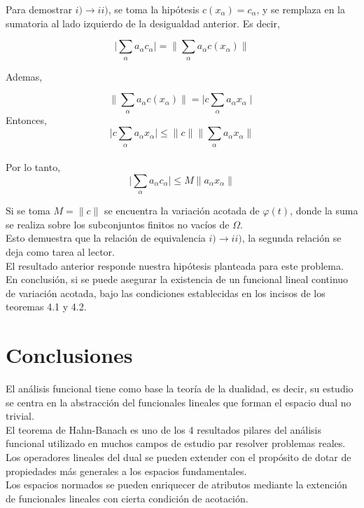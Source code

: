 \documentclass[10pt]{amsart}
\theoremstyle{remark}
\numberwithin{equation}{section}
\begin{document}
Para demostrar $i) \to ii)$, se toma la hipótesis $c(x_\alpha) = c_\alpha$, y se remplaza en la sumatoria al lado izquierdo de la desigualdad anterior. Es decir,

\[\mid \sum_\alpha a_\alpha c_\alpha \mid = \lVert \sum_\alpha a_\alpha c(x_\alpha) \rVert \]

Ademas,

\[\lVert \sum_\alpha a_\alpha c(x_\alpha) \rVert = \mid c \sum_\alpha a_\alpha x_\alpha \mid \]
Entonces,
\[\mid c \sum_\alpha a_\alpha x_\alpha \mid \leq \lVert c \rVert \lVert \sum_\alpha a_\alpha x_\alpha \rVert \]\\

Por lo tanto, 
\[\mid \sum_\alpha a_\alpha c_\alpha \mid \leq M \lVert a_\alpha x_\alpha \rVert\] 

Si se toma $M= \lVert c \rVert$ se encuentra la variación acotada de $\varphi(t)$, donde la suma se realiza sobre los subconjuntos finitos no vacíos de $\varOmega$.\\ 

Esto demuestra que la relación de equivalencia $i) \to ii)$, la segunda relación se deja como tarea al lector.\\ 


El resultado anterior responde nuestra hipótesis planteada para este problema. En conclusión, si se puede asegurar la existencia de un funcional lineal continuo de variación acotada, bajo las condiciones establecidas en los incisos de los teoremas 4.1 y 4.2.

\newpage
\section{Conclusiones}
El análisis funcional tiene como base la teoría de la dualidad, es decir, su estudio se centra en la abstracción del funcionales lineales que forman el espacio dual no trivial.\\

El teorema de Hahn-Banach es uno de los 4 resultados pilares del análisis funcional utilizado en muchos campos de estudio par resolver problemas reales.\\

Los operadores lineales del dual se pueden extender con el propósito de dotar de propiedades más generales a los espacios fundamentales.\\

Los espacios normados se pueden enriquecer de atributos mediante la extención de funcionales lineales con cierta condición de acotación.\\
\end{document}
